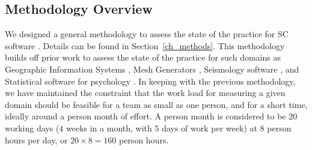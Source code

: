 \documentclass[3p, 12pt,authoryear]{elsarticle}
\begin{document}

\subsection{Methodology Overview}

We designed a general methodology to assess the state of the practice for SC
software \citep{SmithEtAl2021}. Details can be found in
Section~\ref{ch_methods}.  This methodology builds off prior work to assess the
state of the practice for such domains as Geographic Information Systems
\citep{smith2018state}, Mesh Generators \citep{smith2016state}, Seismology
software \citep{Smith2018Seismology}, and Statistical software for psychology
\citep{smith2018statistical}.  In keeping with the previous methodology, we have
maintained the constraint that the work load for measuring a given domain should
be feasible for a team as small as one person, and for a short time, ideally
around a person month of effort. A person month is considered to be $20$ working
days ($4$ weeks in a month, with $5$ days of work per week) at $8$ person hours
per day, or $20 \times 8 = 160$ person hours.
\end{document}
